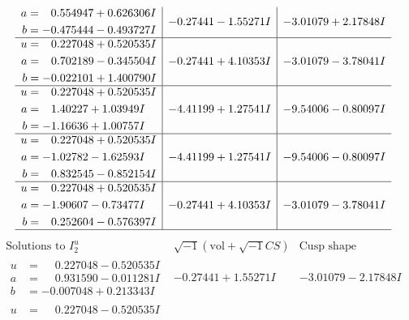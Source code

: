 \documentclass[1p]{elsarticle_modified}
\theoremstyle{definition}
\newcommand{\I}{\sqrt{-1}}
\begin{document}
$$\begin{array}{c|c|c}
\begin{aligned}
a &= \phantom{-}0.554947 + 0.626306 I \\
b &= -0.475444 - 0.493727 I\end{aligned}
 & -0.27441 - 1.55271 I & -3.01079 + 2.17848 I \\ \hline\begin{aligned}
u &= \phantom{-}0.227048 + 0.520535 I \\
a &= \phantom{-}0.702189 - 0.345504 I \\
b &= -0.022101 + 1.400790 I\end{aligned}
 & -0.27441 + 4.10353 I & -3.01079 - 3.78041 I \\ \hline\begin{aligned}
u &= \phantom{-}0.227048 + 0.520535 I \\
a &= \phantom{-}1.40227 + 1.03949 I \\
b &= -1.16636 + 1.00757 I\end{aligned}
 & -4.41199 + 1.27541 I & -9.54006 - 0.80097 I \\ \hline\begin{aligned}
u &= \phantom{-}0.227048 + 0.520535 I \\
a &= -1.02782 - 1.62593 I \\
b &= \phantom{-}0.832545 - 0.852154 I\end{aligned}
 & -4.41199 + 1.27541 I & -9.54006 - 0.80097 I \\ \hline\begin{aligned}
u &= \phantom{-}0.227048 + 0.520535 I \\
a &= -1.90607 - 0.73477 I \\
b &= \phantom{-}0.252604 - 0.576397 I\end{aligned}
 & -0.27441 + 4.10353 I & -3.01079 - 3.78041 I\\
 \hline 
 \end{array}$$\newpage$$\begin{array}{c|c|c}  
\text{Solutions to }I^u_{2}& \I (\text{vol} + \sqrt{-1}CS) & \text{Cusp shape}\\
 \hline 
\begin{aligned}
u &= \phantom{-}0.227048 - 0.520535 I \\
a &= \phantom{-}0.931590 - 0.011281 I \\
b &= -0.007048 + 0.213343 I\end{aligned}
 & -0.27441 + 1.55271 I & -3.01079 - 2.17848 I \\ \hline\begin{aligned}
u &= \phantom{-}0.227048 - 0.520535 I \\

\end{aligned}
\end{array}$$
\end{document}
